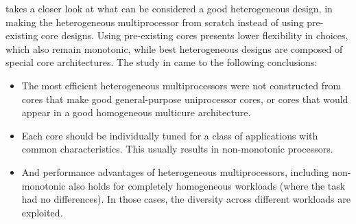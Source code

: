 

\cite{heterogeneous-arch} takes a closer look at what can be considered a good heterogeneous design, in making the heterogeneous multiprocessor from scratch instead of using pre-existing core designs.
Using pre-existing cores presents lower flexibility in choices, which also remain monotonic, while best heterogeneous designs are composed of special core architectures.
The study in \cite{heterogeneous-arch} came to the following conclusions:
\begin{itemize}
\item The most efficient heterogeneous multiprocessors were not constructed from cores that make good general-purpose uniprocessor cores, or cores that would appear in a good homogeneous multicure architecture.
\item Each core should be individually tuned for a class of applications with common characteristics.
      This usually results in non-monotonic processors.
\item And performance advantages of heterogeneous multiprocessors, including non-monotonic also holds for completely homogeneous workloads (where the task had no differences).
    In those cases, the diversity across different workloads are exploited.
\end{itemize}

